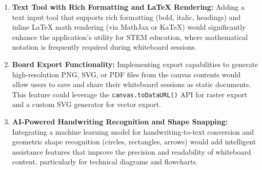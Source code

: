 \documentclass[12pt,a4paper]{report}
\begin{document}
\begin{enumerate}[label=\arabic*.]
  \item \textbf{Text Tool with Rich Formatting and LaTeX Rendering:} Adding a text input tool that supports rich formatting (bold, italic, headings) and inline LaTeX math rendering (via MathJax or KaTeX) would significantly enhance the application's utility for STEM education, where mathematical notation is frequently required during whiteboard sessions.

  \item \textbf{Board Export Functionality:} Implementing export capabilities to generate high-resolution PNG, SVG, or PDF files from the canvas contents would allow users to save and share their whiteboard sessions as static documents. This feature could leverage the \texttt{canvas.toDataURL()} API for raster export and a custom SVG generator for vector export.

  \item \textbf{AI-Powered Handwriting Recognition and Shape Snapping:} Integrating a machine learning model for handwriting-to-text conversion and geometric shape recognition (circles, rectangles, arrows) would add intelligent assistance features that improve the precision and readability of whiteboard content, particularly for technical diagrams and flowcharts.
\end{enumerate}


\newpage
{}
\end{document}
